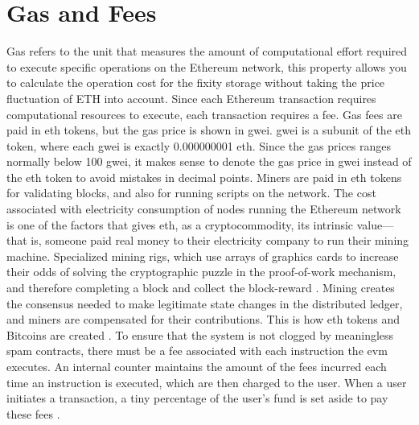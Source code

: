 \section{Gas and Fees}
\label{sec:costs}
Gas refers to the unit that measures the amount of computational effort required to execute specific operations on the Ethereum network, this property allows you to calculate the operation cost for the fixity storage without taking the price fluctuation of ETH into account. Since each Ethereum transaction requires computational resources to execute, each transaction requires a fee.
Gas fees are paid in \acrlong{eth} tokens, but the gas price is shown in \acrlong{gwei}. \acrlong{gwei} is a subunit of the \acrlong{eth} token, where each \acrlong{gwei} is exactly 0.000000001 \acrshort{eth}. Since the gas prices ranges normally below 100 gwei, it makes sense to denote the gas price in \acrlong{gwei} instead of the \acrlong{eth} token to avoid mistakes in decimal points.
Miners are paid in \acrlong{eth} tokens for validating blocks, and also for running scripts on the network. The cost associated with electricity consumption of nodes running the Ethereum network is one of the factors that gives \acrlong{eth}, as a cryptocommodity, its intrinsic value—that is, someone paid real money to their electricity company to run their mining machine. Specialized mining rigs, which use arrays of graphics cards to increase their odds of solving the cryptographic puzzle in the proof-of-work mechanism, and therefore completing a block and collect the block-reward \cite[12]{dannen2017introducing}. 
Mining creates the consensus needed to make legitimate state changes in the distributed ledger, and miners are compensated for their contributions. This is how \acrlong{eth} tokens and Bitcoins are created \cite[57]{dannen2017introducing}. 
To ensure that the system is not clogged by meaningless spam contracts, there must be a fee associated with each instruction the \acrshort{evm} executes. An internal counter maintains the amount of the fees incurred each time an instruction is executed, which are then charged to the user. When a user initiates a \gls{transaction}, a tiny percentage of the user's fund is set aside to pay these fees \cite[58]{dannen2017introducing}. 

